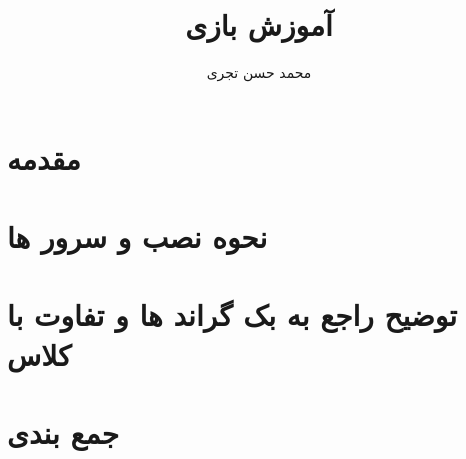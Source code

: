 \documentclass{report}
\title{{\Huge آموزش بازی \lr{dungeon crawl stone soup}}}
\author{{\LARGE محمد حسن تجری}}
\date{{\LARGE}}
\begin{document}
\maketitle

\begin{persian}

  \tableofcontents

  \chapter*{مقدمه}

  \chapter*{نحوه نصب و سرور ها}

  

  \chapter{توضیح راجع به بک گراند ها و تفاوت با کلاس}

  \chapter*{جمع بندی}

\end{persian}
\end{document}
